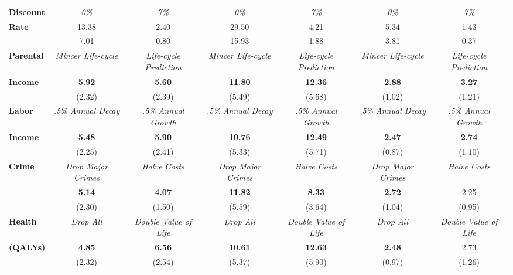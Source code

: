 \begin{tabular}{>{\bfseries}lcc|cc|cc}
Discount 	&	\textit{0\%}	&	\textit{7\%}	&	\textit{0\%}	&	\textit{7\%}	&	\textit{0\%}	&	\textit{7\%}	\\
Rate	&	13.38	&	2.40	&	29.50	&	4.21	&	5.34	&	1.43	\\
	&	7.01	&	0.80	&	15.93	&	1.88	&	3.81	&	0.37	\\ \midrule
Parental	&	\textit{Mincer Life-cycle}	&	\textit{Life-cycle Prediction}	&	\textit{Mincer Life-cycle}	&	\textit{Life-cycle Prediction}	&	\textit{Mincer Life-cycle}	&	\textit{Life-cycle Prediction}	\\
Income	&	\textbf{5.92}	&	\textbf{5.60}	&	\textbf{11.80}	&	\textbf{12.36}	&	\textbf{2.88}	&	\textbf{3.27}	\\
	&	(2.32)	&	(2.39)	&	(5.49)	&	(5.68)	&	(1.02)	&	(1.21)	\\ \midrule
Labor	&	\textit{.5\% Annual Decay}	&	\textit{.5\% Annual Growth}	&	\textit{.5\% Annual Decay}	&	\textit{.5\% Annual Growth}	&	\textit{.5\% Annual Decay}	&	\textit{.5\% Annual Growth}	\\
Income	&	\textbf{5.48}	&	\textbf{5.90}	&	\textbf{10.76}	&	\textbf{12.49}	&	\textbf{2.47}	&	\textbf{2.74}	\\
	&	(2.25)	&	(2.41)	&	(5.33)	&	(5.71)	&	(0.87)	&	(1.10)	\\ \midrule
Crime	&	\textit{Drop Major Crimes}	&	\textit{Halve Costs}	&	\textit{Drop Major Crimes}	&	\textit{Halve Costs}	&	\textit{Drop Major Crimes}	&	\textit{Halve Costs}	\\
	&	\textbf{5.14} 	&	\textbf{4.07}	&	\textbf{11.82}	&	\textbf{8.33}	&	\textbf{2.72}	&	2.25	\\
	&	(2.30)	&	(1.50)	&	(5.59)	&	(3.64)	&	(1.04)	&	(0.95)	\\ \midrule
Health	&	\textit{Drop All}	&	\textit{Double Value of Life}	&	\textit{Drop All}	&	\textit{Double Value of Life}	&	\textit{Drop All}	&	\textit{Double Value of Life}	\\
(QALYs)	&	\textbf{4.85}	&	\textbf{6.56}	&	\textbf{10.61}	&	\textbf{12.63}	&	\textbf{2.48}	&	2.73	\\
	&	(2.32)	&	(2.54)	&	(5.37)	&	(5.90)	&	(0.97)	&	(1.26)	\\ \bottomrule
\end{tabular} 